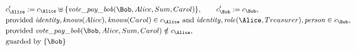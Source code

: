 \begin{align*}
&
c'_
{
\Alice
}
 := 
c_
{
\Alice
}
 \uplus 
\{
\mathit{\detokenize{
vote_pay_bob
}}
(
\Bob
,
Alice
,
Sum
,
Carol
)
\}
, \qquad 
c'_
{
\Bob
}
 := 
c_
{
\Bob
}
,\\
&
\text{provided } 
\mathit{\detokenize{
identity
}}
,
\mathit{\detokenize{
knows
}}
(
Alice
)
,
\mathit{\detokenize{
knows
}}
(
Carol
)
 \in c_
{
\Alice
}
 \text{ and } 
\mathit{\detokenize{
identity
}}
,
\mathit{\detokenize{
role
}}
(
\Alice
,
Treasurer
)
,
\mathit{\detokenize{
person
}}
 \in c_
{
\Bob
}
,\\
&
\text{provided } 
\mathit{\detokenize{
vote_pay_bob
}}
(
\Bob
,
Alice
,
Sum
,
Carol
)
 \notin c_
{
\Alice
}
,\\
&
\text{guarded by } \{
\Bob
\}
\end{align*}

